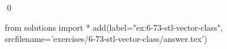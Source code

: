 
\begin{ex}
  \label{ex:6-73-stl-vector-class}
  
  \qed
\end{ex}
\begin{python0}
from solutions import *
add(label="ex:6-73-stl-vector-class",
    srcfilename='exercises/6-73-stl-vector-class/answer.tex')
\end{python0}
